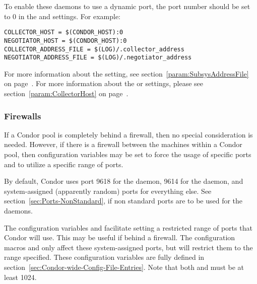 To enable these daemons to use a dynamic port, the port number should
be set to 0 in the  and
 settings.
For example:
\begin{verbatim}
COLLECTOR_HOST = $(CONDOR_HOST):0
NEGOTIATOR_HOST = $(CONDOR_HOST):0
COLLECTOR_ADDRESS_FILE = $(LOG)/.collector_address
NEGOTIATOR_ADDRESS_FILE = $(LOG)/.negotiator_address
\end{verbatim}

For more information about the 
setting, see section~\ref{param:SubsysAddressFile} on
page~\pageref{param:SubsysAddressFile}.
For more information about the  or
 settings, please see
section~\ref{param:CollectorHost} on
page~\pageref{param:CollectorHost}.



\subsubsection{\label{sec:Ports-Firewalls}Firewalls}

If a Condor pool is completely behind a firewall,
then no special consideration is needed.
However, if there is a firewall between the machines within
a Condor pool, then
configuration variables may be set to force the usage of
specific ports and to utilize a specific range of ports.

By default,
Condor uses port 9618 for the  daemon,
9614 for the  daemon,
and system-assigned (apparently random) ports for everything else.
See section~\ref{sec:Ports-NonStandard},
if non standard ports are to be used for the
  daemons.

The configuration variables
 and  facilitate setting a restricted
range of ports that Condor will use.
This may be useful if behind a firewall.
The configuration macros
 and  only affect these
system-assigned ports, but will restrict them to the range specified.
These configuration variables are fully defined
in section~\ref{sec:Condor-wide-Config-File-Entries}.
Note that both  and  must be at least 1024.

% 
%
% 
% 

